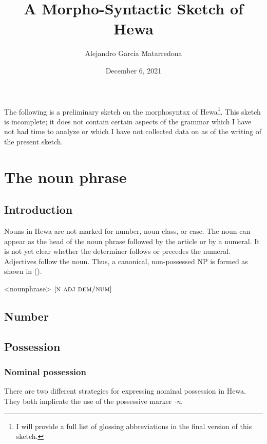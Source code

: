 \documentclass[12pt]{article}
\author{Alejandro García Matarredona}
\title{A Morpho-Syntactic Sketch of Hewa}
\date{December 6, 2021}
\begin{document}
\maketitle

\noindent The following is a preliminary sketch on the morphosyntax of Hewa\footnote{I will provide a full list of glossing  abbreviations in the final version of this sketch.}. This sketch is incomplete; it does not contain certain aspects of the grammar which I have not had time to analyze or which I have not collected data on as of the writing of the present sketch.

\section{The noun phrase}\label{sec:nphr}

\subsection{Introduction}\label{sec:nphr.intr}

Nouns in Hewa are not marked for number, noun class, or case. The noun can appear as the head of the noun phrase followed by the article or by a numeral. It is not yet clear whether the determiner follows or precedes the numeral. Adjectives follow the noun. Thus, a canonical, non-possessed NP is formed as shown in ().

\ex<nounphrase>
$[\textsc{n adj dem/num}]$
\xe



\subsection{Number}

\subsection{Possession}

\subsubsection{Nominal possession}

There are two different strategies for expressing nominal possession in Hewa. They both implicate the use of the possessive marker \textit{-n}.
\end{document}
